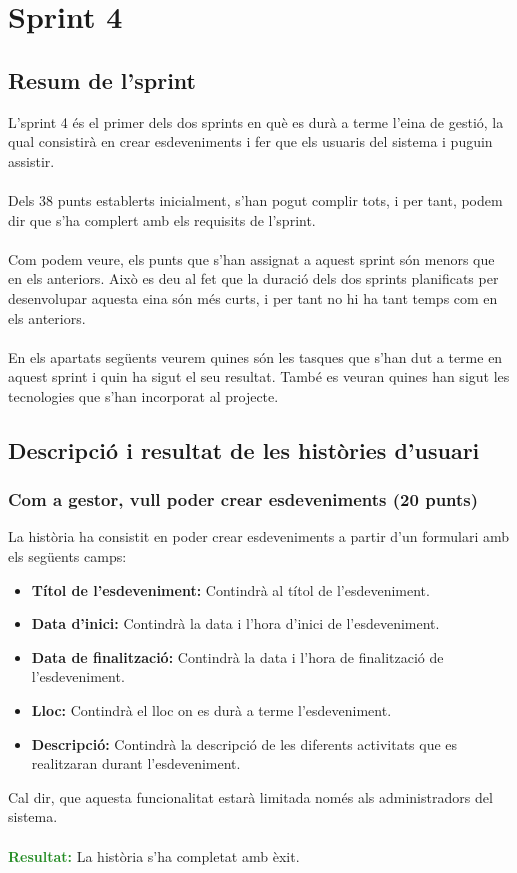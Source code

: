 \documentclass[11pt,catalan,listoffigures,listoftables]{tfgetsinf}
\begin{document}
\section{Sprint 4}

\subsection{Resum de l'sprint}

L'sprint 4 és el primer dels dos sprints en què es durà a terme l'eina de gestió, la qual consistirà en crear esdeveniments i fer que els usuaris del sistema i puguin assistir.\\ \\
Dels 38 punts establerts inicialment, s'han pogut complir tots, i per tant, podem dir que s'ha complert amb els requisits de l'sprint.\\ \\
Com podem veure, els punts que s'han assignat a aquest sprint són menors que en els anteriors. Això es deu al fet que la duració dels dos sprints planificats per desenvolupar aquesta eina són més curts, i per tant no hi ha tant temps com en els anteriors.\\ \\
En els apartats següents veurem quines són les tasques que s'han dut a terme en aquest sprint i quin ha sigut el seu resultat. També es veuran quines han sigut les tecnologies que s'han incorporat al projecte.

\subsection{Descripció i resultat de les històries d'usuari}

\subsubsection{Com a gestor, vull poder crear esdeveniments (20 punts)}

La història ha consistit en poder crear esdeveniments a partir d'un formulari amb els següents camps:
\begin{itemize}
\item \textbf{Títol de l'esdeveniment:} Contindrà al títol de l'esdeveniment.
\item \textbf{Data d'inici:} Contindrà la data i l'hora d'inici de l'esdeveniment.
\item \textbf{Data de finalització:} Contindrà la data i l'hora de finalització de l'esdeveniment.
\item \textbf{Lloc:} Contindrà el lloc on es durà a terme l'esdeveniment.
\item \textbf{Descripció:} Contindrà la descripció de les diferents activitats que es realitzaran durant l'esdeveniment.
\end{itemize}
Cal dir, que aquesta funcionalitat estarà limitada només als administradors del sistema.\\ \\
\textcolor{forestgreen}{\textbf{Resultat:}} La història s'ha completat amb èxit.
\end{document}

